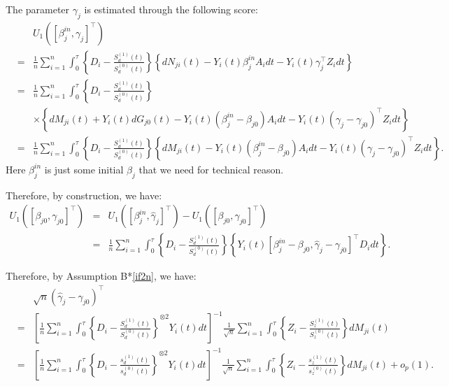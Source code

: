 \documentclass[11pt]{article}
\newcommand{\ee}{\end{eqnarray}}
\newcommand{\eqnn}{\begin{eqnarray*}}
\newcommand{\een}{\end{eqnarray*}}
\newcommand{\be}{\begin{eqnarray}}
\begin{document}
\begin{newproof15}
The parameter $\gamma_j$ is estimated through the following score:
\eqnn
&&U_1\left([ \beta^{in}_{j} ,
           \gamma_j]^\top\right)\\&=&\frac{1}{n}\sum_{i=1}^n\int_0^{\tau}\left\{D_i-\frac{S_d^{(1)}(t)}{S_d^{(0)}(t)}\right\}\left\{dN_{ji}(t)-Y_i(t)\beta^{in}_jA_idt-Y_i(t)\gamma^\top_jZ_idt\right\}\\
           &=&\frac{1}{n}\sum_{i=1}^n\int_0^{\tau}\left\{D_i-\frac{S_d^{(1)}(t)}{S_d^{(0)}(t)}\right\}
           \\
           &&\times\left\{dM_{ji}(t)+Y_i(t)dG_{j0}(t)-Y_i(t)(\beta^{in}_j-\beta_{j0})A_idt-Y_i(t)(\gamma_j-\gamma_{j0})^\top Z_idt\right\}\nonumber\\
           &=&\frac{1}{n}\sum_{i=1}^n\int_0^{\tau}\left\{D_i-\frac{S_d^{(1)}(t)}{S_d^{(0)}(t)}\right\}\left\{dM_{ji}(t)-Y_i(t)(\beta^{in}_j-\beta_{j0})A_idt-Y_i(t)(\gamma_j-\gamma_{j0})^\top Z_idt\right\}. \nonumber
\een
Here $\beta^{in}_j$ is just some initial $\beta_j$ that we need for technical reason.

Therefore, by construction, we have:
\be
U_1\left([ \beta_{j0} ,
           \gamma_{j0}]^\top\right)&=&U_1\left([ \beta^{in}_{j} ,
           \hat \gamma_j]^\top\right)-U_1\left([ \beta_{j0} ,
           \gamma_{j0}]^\top\right)\\
           &=&\frac{1}{n}\sum_{i=1}^n\int_0^{\tau}\left\{D_i-\frac{S_d^{(1)}(t)}{S_d^{(0)}(t)}\right\}\left\{Y_i(t)[
           \beta^{in}_j-\beta_{j0},
           \hat\gamma_j-\gamma_{j0}]^\top D_idt\right\}.
\ee

Therefore, by Assumption B*\ref{if2n}, we have:
\be\label{2ifn}
&&\sqrt{n}(\hat\gamma_j-\gamma_{j0})^\top\\&=&\left[\frac{1}{n}\sum_{i=1}^n\int_0^{\tau}\left\{D_i-\frac{S_d^{(1)}(t)}{S_d^{(0)}(t)}\right\}^{\otimes 2}Y_i(t)dt\right]^{-1}\frac{1}{\sqrt{n}}\sum_{i=1}^n
\int_0^\tau \left\{Z_i-\frac{S_z^{(1)}(t)}{S_z^{(0)}(t)}\right\}dM_{ji}(t)\nonumber\\
&=&\left[\frac{1}{n}\sum_{i=1}^n\int_0^{\tau}\left\{D_i-\frac{s_d^{(1)}(t)}{s_d^{(0)}(t)}\right\}^{\otimes 2}Y_i(t)dt\right]^{-1}\frac{1}{\sqrt{n}}\sum_{i=1}^n
\int_0^\tau \left\{Z_i-\frac{s_z^{(1)}(t)}{s_z^{(0)}(t)}\right\}dM_{ji}(t)+o_p(1).\nonumber\\
\ee
\end{newproof15}
\end{document}
